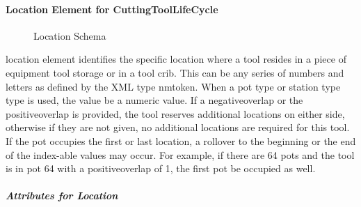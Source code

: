\documentclass{mtconnect}	%
\begin{document}
\paragraph{Location Element for CuttingToolLifeCycle}\mbox{}

\begin{figure}[ht]
  \centering
  \caption{Location Schema}
  \label{fig:location-schema}
\end{figure}

\FloatBarrier

\gls{location} element identifies the specific location where a tool resides in a piece of equipment tool storage or in a tool crib.  This can be any series of numbers and letters as defined by the XML type \gls{nmtoken}.  When a \gls{pot type} or \gls{station type} type is used, the value \MUST be a numeric value.  If a \gls{negativeoverlap} or the \gls{positiveoverlap} is provided, the tool reserves additional locations on either side, otherwise if they are not given, no additional locations are required for this tool.  If the pot occupies the first or last location, a rollover to the beginning or the end of the index-able values may occur.  For example, if there are 64 pots and the tool is in pot 64 with a \gls{positiveoverlap} of 1, the first pot \MAY be occupied as well.

\subparagraph{Attributes for Location}\mbox{}
\end{document}
